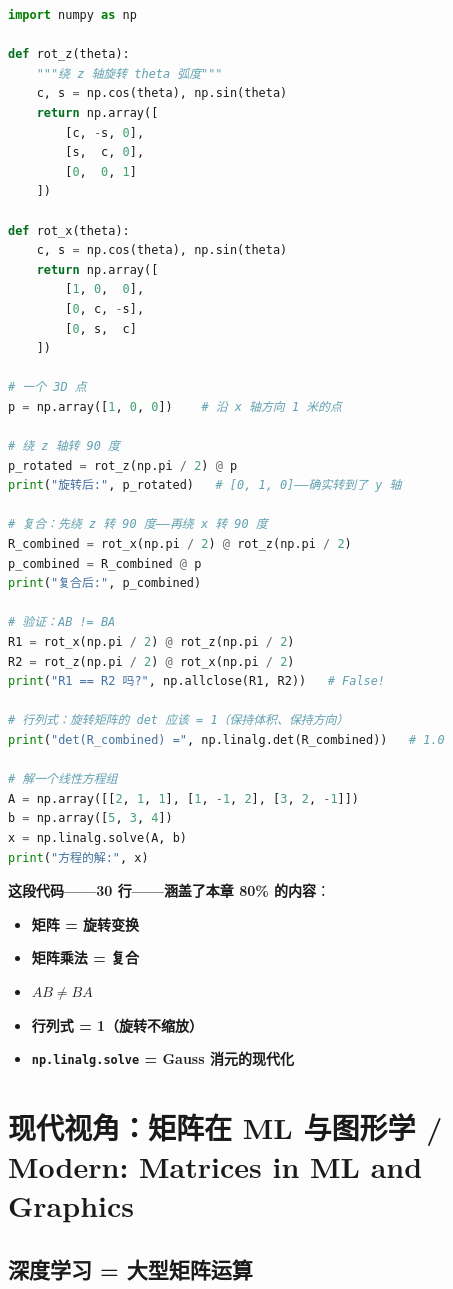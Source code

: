 \begin{lstlisting}[language=Python]
import numpy as np

def rot_z(theta):
    """绕 z 轴旋转 theta 弧度"""
    c, s = np.cos(theta), np.sin(theta)
    return np.array([
        [c, -s, 0],
        [s,  c, 0],
        [0,  0, 1]
    ])

def rot_x(theta):
    c, s = np.cos(theta), np.sin(theta)
    return np.array([
        [1, 0,  0],
        [0, c, -s],
        [0, s,  c]
    ])

# 一个 3D 点
p = np.array([1, 0, 0])    # 沿 x 轴方向 1 米的点

# 绕 z 轴转 90 度
p_rotated = rot_z(np.pi / 2) @ p
print("旋转后:", p_rotated)   # [0, 1, 0]——确实转到了 y 轴

# 复合：先绕 z 转 90 度——再绕 x 转 90 度
R_combined = rot_x(np.pi / 2) @ rot_z(np.pi / 2)
p_combined = R_combined @ p
print("复合后:", p_combined)

# 验证：AB != BA
R1 = rot_x(np.pi / 2) @ rot_z(np.pi / 2)
R2 = rot_z(np.pi / 2) @ rot_x(np.pi / 2)
print("R1 == R2 吗?", np.allclose(R1, R2))   # False!

# 行列式：旋转矩阵的 det 应该 = 1（保持体积、保持方向）
print("det(R_combined) =", np.linalg.det(R_combined))   # 1.0

# 解一个线性方程组
A = np.array([[2, 1, 1], [1, -1, 2], [3, 2, -1]])
b = np.array([5, 3, 4])
x = np.linalg.solve(A, b)
print("方程的解:", x)
\end{lstlisting}

\textbf{这段代码——\textbf{30 行}——\textbf{涵盖了本章 80\% 的内容}}：

\begin{itemize}
\item \textbf{矩阵 = 旋转变换}
\item \textbf{矩阵乘法 = 复合}
\item \textbf{$AB \ne BA$}
\item \textbf{行列式 = 1（旋转不缩放）}
\item \textbf{\texttt{np.linalg.solve} = Gauss 消元的现代化}
\end{itemize}

\section{现代视角：矩阵在 ML 与图形学 / Modern: Matrices in ML and Graphics}

\subsection{深度学习 = 大型矩阵运算}

